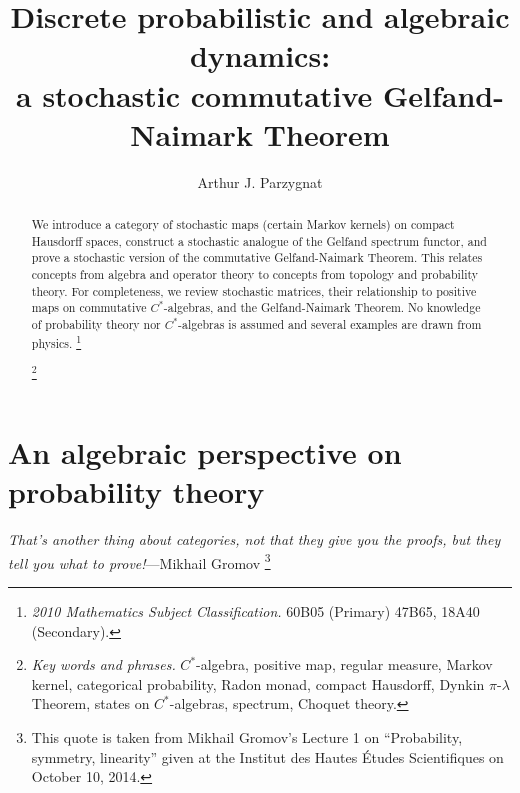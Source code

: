 \documentclass[12pt]{article}
\title{Discrete probabilistic and algebraic dynamics:\\
a stochastic commutative Gelfand-Naimark Theorem}
\author{Arthur J. Parzygnat}
\date{}
\theoremstyle{theorem}
\theoremstyle{definition}
\numberwithin{equation}{section}
\let\l=\lambda \let\r=\rho
\newcommand{\<}{\langle}
\renewcommand{\>}{\rangle}
\newcommand\blfootnote[1]{%
  \begingroup
  \renewcommand\thefootnote{}\footnote{#1}%
  \addtocounter{footnote}{-1}%
  \endgroup
}
\begin{document}
\maketitle 

\begin{abstract}
We introduce a category of stochastic maps 
(certain Markov kernels) on 
compact Hausdorff spaces, 
construct a stochastic analogue of the
Gelfand spectrum functor, 
and prove a stochastic version of the commutative Gelfand-Naimark Theorem.
This relates concepts from algebra and operator theory 
to concepts from topology and probability theory. 
For completeness, we review stochastic matrices, 
their relationship to positive maps on commutative $C^*$-algebras, 
and the Gelfand-Naimark Theorem. 
No knowledge of probability theory 
nor $C^*$-algebras is assumed 
and several examples are drawn from physics.
\blfootnote{\emph{2010 Mathematics Subject Classification.} 
60B05 (Primary) %
47B65, %
18A40 (Secondary). %
}
\blfootnote{
\emph{Key words and phrases.} 
$C^*$-algebra, 
positive map, 
regular measure,  
Markov kernel, 
categorical probability, 
Radon monad,
compact Hausdorff, 
Dynkin $\pi$-$\l$ Theorem, 
states on $C^*$-algebras, 
spectrum, 
Choquet theory.
}
\end{abstract}

\tableofcontents



\section{An algebraic perspective on probability theory}
\label{sec:fancywords}

\begin{displayquote}
\emph{That's another thing about categories, not that they give you the proofs, but they tell you what to prove!}---Mikhail Gromov%
\footnote{This quote is taken from Mikhail Gromov's 
Lecture 1 on ``Probability, symmetry, linearity''
given at the Institut des Hautes \'Etudes Scientifiques on October 10, 2014.}
\end{displayquote}
\end{document}

